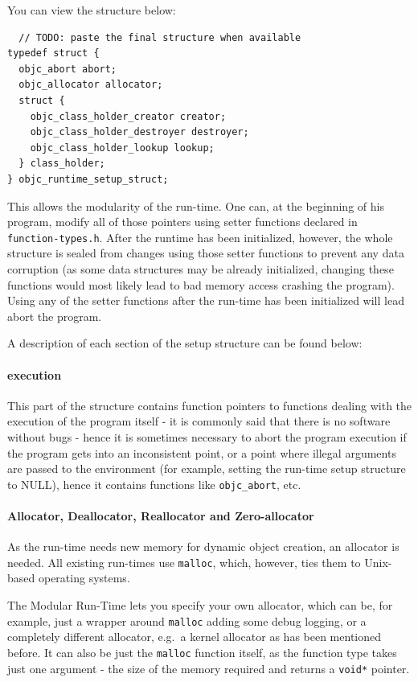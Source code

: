 You can view the structure below:

\begin{verbatim}
  // TODO: paste the final structure when available
typedef struct {
  objc_abort abort;
  objc_allocator allocator;
  struct {
    objc_class_holder_creator creator;
    objc_class_holder_destroyer destroyer;
    objc_class_holder_lookup lookup;
  } class_holder;
} objc_runtime_setup_struct;
\end{verbatim}

This allows the modularity of the run-time. One can, at the beginning of his program, modify all of those pointers using setter functions declared in \verb=function-types.h=. After the runtime has been initialized, however, the whole structure is sealed from changes using those setter functions to prevent any data corruption (as some data structures may be already initialized, changing these functions would most likely lead to bad memory access crashing the program). Using any of the setter functions after the run-time has been initialized will lead abort the program.

A description of each section of the setup structure can be found below:

\paragraph{execution}

This part of the structure contains function pointers to functions dealing with the execution of the program itself - it is commonly said that there is no software without bugs - hence it is sometimes necessary to abort the program execution if the program gets into an inconsistent point, or a point where illegal arguments are passed to the environment (for example, setting the run-time setup structure to NULL), hence it contains functions like \verb=objc_abort=, etc.

\paragraph{Allocator, Deallocator, Reallocator and Zero-allocator}

As the run-time needs new memory for dynamic object creation, an allocator is needed. All existing run-times use \verb=malloc=, which, however, ties them to Unix-based operating systems.

The Modular Run-Time lets you specify your own allocator, which can be, for example, just a wrapper around \verb=malloc= adding some debug logging, or a completely different allocator, e.g.\ a kernel allocator as has been mentioned before. It can also be just the \verb=malloc= function itself, as the function type takes just one argument - the size of the memory required and returns a \verb=void*= pointer.

